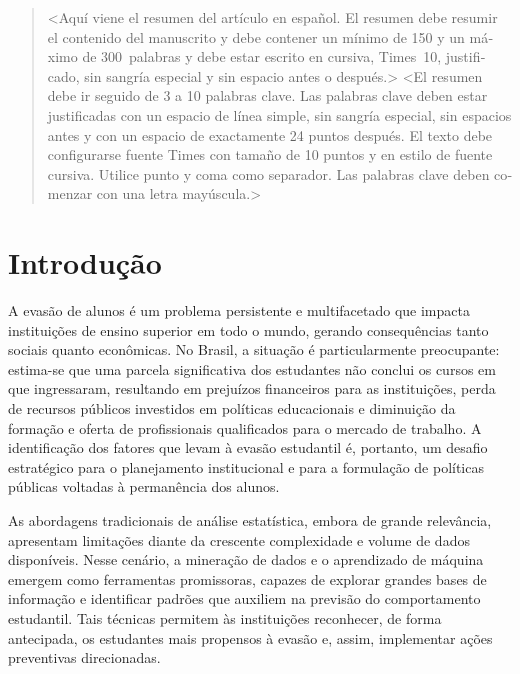 \documentclass[english, spanish, brazilian]{RBIEarticle} %
\begin{document}
\begin{otherlanguage}{spanish}
\begin{abstract}
<Aquí viene el resumen del artículo en español. El resumen debe resumir el contenido del manuscrito y debe contener un mínimo de 150 y un máximo de 300~palabras y debe estar escrito en cursiva, Times~10, justificado, sin sangría especial y sin espacio antes o después.>
\keywords <El resumen debe ir seguido de 3 a 10 palabras clave. Las palabras clave deben estar justificadas con un espacio de línea simple, sin sangría especial, sin espacios antes y con un espacio de exactamente 24 puntos después. El texto debe configurarse fuente Times con tamaño de 10 puntos y en estilo de fuente cursiva. Utilice punto y coma como separador. Las palabras clave deben comenzar con una letra mayúscula.>
\end{abstract}
\end{otherlanguage}

\pagebreak


\section{Introdução}
A evasão de alunos é um problema persistente e multifacetado que impacta instituições de ensino superior em todo o mundo, gerando consequências tanto sociais quanto econômicas. No Brasil, a situação é particularmente preocupante: estima-se que uma parcela significativa dos estudantes não conclui os cursos em que ingressaram, resultando em prejuízos financeiros para as instituições, perda de recursos públicos investidos em políticas educacionais e diminuição da formação e oferta de profissionais qualificados para o mercado de trabalho. A identificação dos fatores que levam à evasão estudantil é, portanto, um desafio estratégico para o planejamento institucional e para a formulação de políticas públicas voltadas à permanência dos alunos.

As abordagens tradicionais de análise estatística, embora de grande relevância, apresentam limitações diante da crescente complexidade e volume de dados disponíveis. Nesse cenário, a mineração de dados e o aprendizado de máquina emergem como ferramentas promissoras, capazes de explorar grandes bases de informação e identificar padrões que auxiliem na previsão do comportamento estudantil. Tais técnicas permitem às instituições reconhecer, de forma antecipada, os estudantes mais propensos à evasão e, assim, implementar ações preventivas direcionadas.
\end{document}
